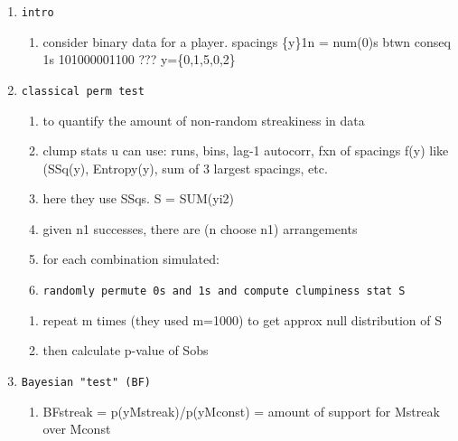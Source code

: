 \documentclass[12pt,twoside]{dukestatscithesis}
\providecommand{\tightlist}{%
  \setlength{\itemsep}{0pt}\setlength{\parskip}{0pt}}
\theoremstyle{definition}
\theoremstyle{definition}
\theoremstyle{definition}
\theoremstyle{remark}
\begin{document}
\begin{enumerate}
\def\labelenumi{\arabic{enumi}.}
\item
\begin{verbatim}
intro
\end{verbatim}
  \begin{enumerate}
  \def\labelenumii{\alph{enumii}.}
  \tightlist
  \item
    consider binary data for a player. spacings \{y\}1n = num(0)s btwn
    conseq 1s 101000001100 ??? y=\{0,1,5,0,2\}
  \end{enumerate}
\item
\begin{verbatim}
classical perm test
\end{verbatim}
  \begin{enumerate}
  \def\labelenumii{\alph{enumii}.}
  \item
    to quantify the amount of non-random streakiness in data
  \item
    clump stats u can use: runs, bins, lag-1 autocorr, fxn of spacings
    f(y) like (SSq(y), Entropy(y), sum of 3 largest spacings, etc.
  \item
    here they use SSqs. S = SUM(yi2)
  \item
    given n1 successes, there are (n choose n1) arrangements
  \item
    for each combination simulated:
  \item
\begin{verbatim}
randomly permute 0s and 1s and compute clumpiness stat S
\end{verbatim}
  \end{enumerate}
  \begin{enumerate}
  \def\labelenumii{\roman{enumii}.}
  \setcounter{enumii}{1}
  \tightlist
  \item
    repeat m times (they used m=1000) to get approx null distribution of
    S
  \item
    then calculate p-value of Sobs\\
  \end{enumerate}
\item
\begin{verbatim}
Bayesian "test" (BF)
\end{verbatim}
  \begin{enumerate}
  \def\labelenumii{\alph{enumii}.}
  \tightlist
  \item
    BFstreak = p(y\textbar{}Mstreak)/p(y\textbar{}Mconst) = amount of
    support for Mstreak over Mconst
  \end{enumerate}
\end{enumerate}
\end{document}
